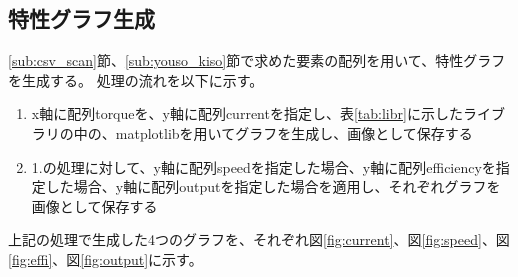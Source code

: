 \subsection{特性グラフ生成}\label{sub:toku_gurahu}
\ref{sub:csv_scan}節、\ref{sub:youso_kiso}節で求めた要素の配列を用いて、特性グラフを生成する。
処理の流れを以下に示す。
\begin{enumerate}
    \item x軸に配列torqueを、y軸に配列currentを指定し、表\ref{tab:libr}に示したライブラリの中の、matplotlibを用いてグラフを生成し、画像として保存する
    \item 1.の処理に対して、y軸に配列speedを指定した場合、y軸に配列efficiencyを指定した場合、y軸に配列outputを指定した場合を適用し、それぞれグラフを画像として保存する
\end{enumerate}
上記の処理で生成した4つのグラフを、それぞれ図\ref{fig:current}、図\ref{fig:speed}、図\ref{fig:effi}、図\ref{fig:output}に示す。
